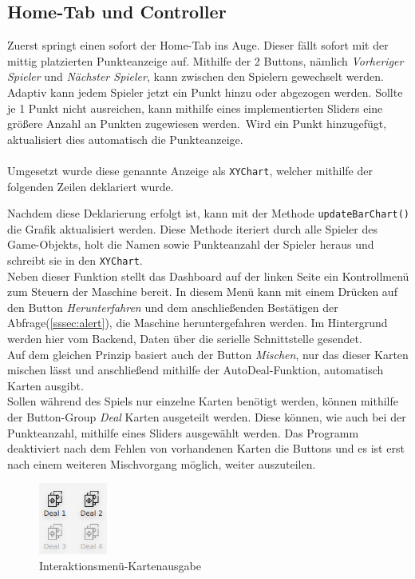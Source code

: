 \subsection{Home-Tab und Controller}
Zuerst springt einen sofort der Home-Tab ins Auge.
Dieser fällt sofort mit der mittig platzierten Punkteanzeige auf.
Mithilfe der 2 Buttons, nämlich \textit{Vorheriger Spieler} und \textit{Nächster Spieler}, kann zwischen den Spielern gewechselt werden.
Adaptiv kann jedem Spieler jetzt ein Punkt hinzu oder abgezogen werden.
Sollte je 1 Punkt nicht ausreichen, kann mithilfe eines implementierten Sliders eine größere Anzahl an Punkten zugewiesen werden.\
Wird ein Punkt hinzugefügt, aktualisiert dies automatisch die Punkteanzeige.\\\\
Umgesetzt wurde diese genannte Anzeige als \lstinline[style=java]{XYChart}, welcher mithilfe der folgenden Zeilen deklariert wurde.

Nachdem diese Deklarierung erfolgt ist, kann mit der Methode \lstinline[style=java]{updateBarChart()} die Grafik aktualisiert werden.
Diese Methode iteriert durch alle Spieler des Game-Objekts, holt die Namen sowie Punkteanzahl der Spieler heraus und schreibt sie in den \lstinline[style=java]{XYChart}.\\
Neben dieser Funktion stellt das Dashboard auf der linken Seite ein Kontrollmenü zum Steuern der Maschine bereit.
In diesem Menü kann mit einem Drücken auf den Button \textit{Herunterfahren} und dem anschließenden Bestätigen der Abfrage(\autoref{sssec:alert}), die Maschine heruntergefahren werden.
Im Hintergrund werden hier vom Backend, Daten über die serielle Schnittstelle gesendet.\\
Auf dem gleichen Prinzip basiert auch der Button \textit{Mischen}, nur das dieser Karten mischen lässt und anschließend mithilfe der AutoDeal-Funktion, automatisch Karten ausgibt.\\
Sollen während des Spiels nur einzelne Karten benötigt werden, können mithilfe der Button-Group \textit{Deal} Karten ausgeteilt werden.
Diese können, wie auch bei der Punkteanzahl, mithilfe eines Sliders ausgewählt werden.
Das Programm deaktiviert nach dem Fehlen von vorhandenen Karten die Buttons und es ist erst nach einem weiteren Mischvorgang möglich, weiter auszuteilen.\\
\begin{figure}[H]
\centering
\vspace{-5mm}
\includegraphics[width=0.2\textwidth]{fig/ainf/Interface.png}
\caption{Interaktionsmenü-Kartenausgabe}
\label{interface}
\end{figure}
